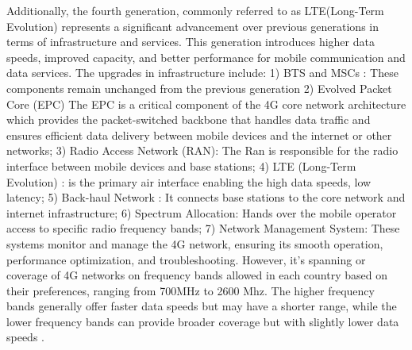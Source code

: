 \documentclass[12pt,a4paper, oneside]{book}
\begin{document}
	   Additionally, the fourth generation, commonly referred to as LTE(Long-Term Evolution) represents a significant advancement over previous generations in terms of infrastructure and services. This generation introduces higher data speeds, improved capacity, and better performance for mobile communication and data services. The upgrades in infrastructure include: 1) BTS and MSCs : These components remain unchanged from the previous generation 2) Evolved Packet Core (EPC)  The EPC is a critical component of the 4G core network architecture which provides the packet-switched backbone that handles data traffic and ensures efficient data delivery between mobile devices and the internet or other networks; 3)  Radio Access Network (RAN): The Ran is responsible for the radio interface between mobile devices and base stations; 4) LTE (Long-Term Evolution) :  is the primary air interface enabling the high data speeds, low latency; 5) Back-haul Network : It connects base stations to the core network and internet infrastructure; 6) Spectrum Allocation: Hands over the mobile operator access to specific radio frequency bands; 7) Network Management System: These systems monitor and manage the 4G network, ensuring its smooth operation, performance optimization, and troubleshooting.
	   However, it's spanning or coverage of 4G networks on frequency bands allowed in each country based on their preferences, ranging from 700MHz to 2600 Mhz. The higher frequency bands generally offer faster data speeds but may have a shorter range, while the lower frequency bands can provide broader coverage but with slightly lower data speeds \citep{mishra2007advanced}.
\end{document}
